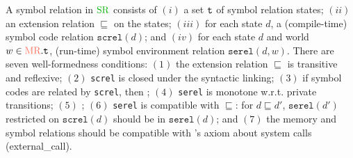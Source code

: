 
A symbol relation in $\SREL$ consists of $(i)$ a set $\texttt{t}$ of symbol relation states; $(ii)$ 
an extension relation $\sqsubseteq$ on the states; $(iii)$ for each state $d$,
a (compile-time) symbol code relation $\texttt{screl}(d)$; and $(iv)$ for each state $d$ and world $w \in \MREL.\code{t}$,
(run-time) symbol environment relation $\texttt{serel}(d,w)$.
There are seven well-formedness conditions:
$(1)$ the extension relation $\sqsubseteq$ is transitive and reflexive;
$(2)$ \texttt{screl} is closed under the syntactic linking;
$(3)$ if symbol codes are related by \texttt{screl}, then ;
$(4)$ \texttt{serel} is monotone w.r.t. private transitions;
$(5)$ ;
$(6)$ \texttt{serel} is compatible with $\sqsubseteq$: for $d \sqsubseteq d'$, $\texttt{serel}(d')$ restricted on $\texttt{screl}(d)$ should be in $\texttt{serel}(d)$; and
$(7)$ the memory and symbol relations should be compatible with \cc{}'s axiom about system calls (\ie \textrm{external\_call}).




